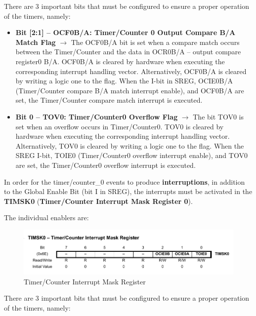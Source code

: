 There are 3 important bits that must be configured to ensure a proper operation of the timers, namely:

\begin{itemize}
    \item \textbf{Bit [2:1] – OCF0B/A: Timer/Counter 0 Output Compare B/A Match Flag} $\bm{\rightarrow}$ The OCF0B/A bit is set when a compare match occurs between the Timer/Counter and the data in OCR0B/A – output compare register0 B/A. OCF0B/A is cleared by hardware when executing the corresponding interrupt handling vector. Alternatively, OCF0B/A is cleared by writing a logic one to the flag. When the I-bit in SREG, OCIE0B/A (Timer/Counter compare B/A match interrupt enable), and OCF0B/A are set, the Timer/Counter compare match interrupt is executed.
    
    \item \textbf{Bit 0 – TOV0: Timer/Counter0 Overflow Flag} $\bm{\rightarrow}$ The bit TOV0 is set when an overflow occurs in Timer/Counter0. TOV0 is cleared by hardware when executing the corresponding interrupt handling vector. Alternatively, TOV0 is cleared by writing a logic one to the flag. When the
    SREG I-bit, TOIE0 (Timer/Counter0 overflow interrupt enable), and TOV0 are set, the Timer/Counter0 overflow interrupt is executed.
\end{itemize}


In order for the timer/counter\_0 events to produce \textbf{interruptions}, in addition to the Global Enable Bit (bit I in SREG), the interrupts must be activated in the \textbf{TIMSK0} (\textbf{Timer/Counter Interrupt Mask Register 0}).\medskip

The individual enablers are:

\begin{figure}[H]
    \centering
    \includegraphics[width = \textwidth]{Graphics/MICROS/Practice 4/DATASHEET/TIMSK0.pdf}
    \caption{Timer/Counter Interrupt Mask Register}
    \label{fig:TIMSK0}
\end{figure}

\clearpage

There are 3 important bits that must be configured to ensure a proper operation of the timers, namely:

